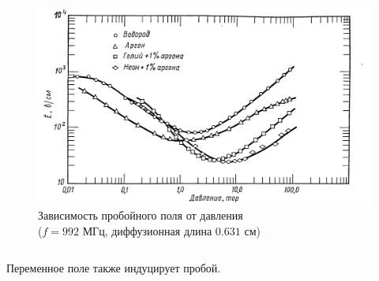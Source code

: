 \documentclass{beamer}
\begin{document}
\begin{frame}
\begin{columns}
			\begin{figure}
				\centering
				\includegraphics[width=1\linewidth]{res/microwave_discharge.png}
				\caption*{Зависимость пробойного поля от давления\\ ($f = 992$ МГц, диффузионная длина $0.631$ см)}
			\end{figure}
			
		\end{columns}		
		
		Переменное поле также индуцирует пробой.

	\end{frame}
\end{document}

